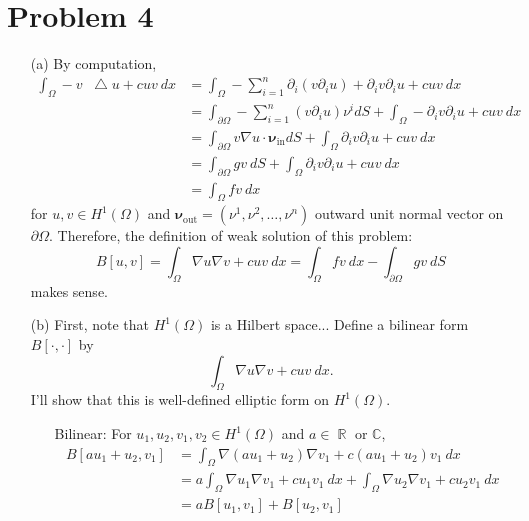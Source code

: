 \documentclass{article}
\DeclareMathOperator{\rr}{\mathbb{R}}
\newcommand*\Laplace{\mathop{}\!\mathbin\bigtriangleup}
\begin{document}
\section*{Problem 4}
\begin{enumerate}
\item[(a)] By computation,
\begin{equation*}
\begin{split}
\int_\Omega -v\Laplace u+cuv~dx&=\int_\Omega -\sum\limits_{i=1}^n \partial_i (v\partial_i u)+\partial_i v \partial_i u+cuv~dx \\
&=\int_{\partial \Omega} -\sum\limits_{i=1}^n \left(v\partial_i u\right)\nu^i dS+\int_\Omega -\partial_i v \partial_i u+cuv~dx \\
&=\int_{\partial \Omega} v\nabla u \cdot \bm{\nu}_{\text{in}}dS+\int_\Omega \partial_i v \partial_i u+cuv~dx \\
&=\int_{\partial \Omega} gv~dS+\int_\Omega \partial_i v \partial_i u+cuv~dx \\
&=\int_\Omega fv~dx
\end{split}
\end{equation*}
for $u,v\in H^1(\Omega)$ and $\bm{\nu}_{\text{out}}=(\nu^1,\nu^2, \ldots, \nu^n)$ outward unit normal vector on $\partial \Omega$. Therefore, the definition of weak solution of this problem:
\begin{equation*}
B[u,v]=\int_\Omega \nabla u \nabla v + cuv~dx=\int_\Omega fv~dx-\int_{\partial \Omega} gv~dS
\end{equation*}
makes sense.
\item[(b)] First, note that $H^1(\Omega)$ is a Hilbert space... Define a bilinear form $B[\cdot,\cdot]$ by
\begin{equation*}
\int_\Omega \nabla u \nabla v + cuv~dx.
\end{equation*}
I'll show that this is well-defined elliptic form on $H^1(\Omega)$.
\begin{enumerate}
\item[Bilinear:] For $u_1,u_2,v_1, v_2\in H^1(\Omega)$ and $a\in \rr$ or $\mathbb{C}$,
\begin{equation*}
\begin{split}
B[au_1+u_2,v_1]&=\int_\Omega \nabla (au_1+u_2) \nabla v_1 + c(au_1+u_2)v_1~dx\\
&=a\int_\Omega \nabla u_1\nabla v_1 + c u_1v_1~dx+\int_\Omega \nabla u_2 \nabla v_1 + cu_2v_1~dx\\
&=aB[u_1,v_1]+B[u_2,v_1]
\end{split}
\end{equation*}

\end{enumerate}
\end{enumerate}
\end{document}
